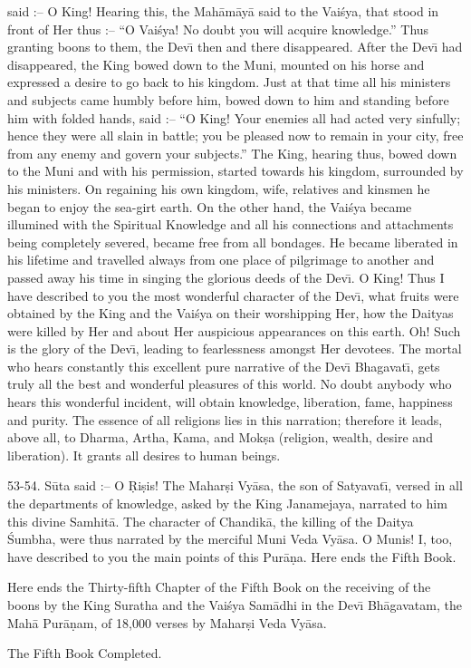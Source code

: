said :-- O King! Hearing this, the Mah\=am\=ay\=a said to the Vai\'sya, that stood in front of Her thus :-- ``O Vai\'sya! No doubt you will acquire knowledge.'' Thus granting boons to them, the Dev\={\i} then and there disappeared. After the Dev\={\i} had disappeared, the King bowed down to the Muni, mounted on his horse and expressed a desire to go back to his kingdom. Just at that time all his ministers and subjects came humbly before him, bowed down to him and standing before him with folded hands, said :-- ``O King! Your enemies all had acted very sinfully; hence they were all slain in battle; you be pleased now to remain in your city, free from any enemy and govern your subjects.'' The King, hearing thus, bowed down to the Muni and with his permission, started towards his kingdom, surrounded by his ministers. On regaining his own kingdom, wife, relatives and kinsmen he began to enjoy the sea-girt earth. On the other hand, the Vai\'sya became illumined with the Spiritual Knowledge and all his connections and attachments being completely severed, became free from all bondages. He became liberated in his lifetime and travelled always from one place of pilgrimage to another and passed away his time in singing the glorious deeds of the Dev\={\i}. O King! Thus I have described to you the most wonderful character of the Dev\={\i}, what fruits were obtained by the King and the Vai\'sya on their worshipping Her, how the Daityas were killed by Her and about Her auspicious appearances on this earth. Oh! Such is the glory of the Dev\={\i}, leading to fearlessness amongst Her devotees. The mortal who hears constantly this excellent pure narrative of the Dev\={\i} Bhagavat\={\i}, gets truly all the best and wonderful pleasures of this world. No doubt anybody who hears this wonderful incident, will obtain knowledge, liberation, fame, happiness and purity. The essence of all religions lies in this narration; therefore it leads, above all, to Dharma, Artha, Kama, and Mok\d{s}a (religion, wealth, desire and liberation). It grants all desires to human beings.

53-54. S\=uta said :-- O \d{R}i\d{s}is! The Mahar\d{s}i Vy\=asa, the son of Satyavat\={\i}, versed in all the departments of knowledge, asked by the King Janamejaya, narrated to him this divine Samhit\=a. The character of Chandik\=a, the killing of the Daitya \'Sumbha, were thus narrated by the merciful Muni Veda Vy\=asa. O Munis! I, too, have described to you the main points of this Pur\=a\d{n}a. Here ends the Fifth Book.

Here ends the Thirty-fifth Chapter of the Fifth Book on the receiving of the boons by the King Suratha and the Vai\'sya Sam\=adhi in the Dev\={\i} Bh\=agavatam, the Mah\=a Pur\=a\d{n}am, of 18,000 verses by Mahar\d{s}i Veda Vy\=asa.

The Fifth Book Completed.



